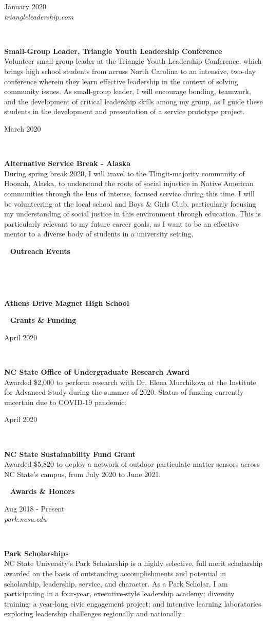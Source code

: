 \documentclass[8pt]{article}
\def \primarycolor   {spacecadet}
\def \tertiarycolor  {airforceblue} %
\def \titlerectmin{0.15cm}
\def \titlerectmax{0.35cm}
\def \leftcolwidth{3.05cm}
\newcommand{\cvheader}[1]{
    \tikz{\fill [\primarycolor] (0,\titlerectmin) rectangle (\leftcolwidth,\titlerectmax);} \ 
    \textcolor{\primarycolor}{ \large{\textbf{#1}} } 
}
\newcommand{\cventry}[4]{
    \begin{minipage}[t]{\leftcolwidth} 
        \small{
            \begin{flushright}
                #2\\
                \textcolor{\tertiarycolor}{\textit{#4}}
            \end{flushright}
        }
    \end{minipage} \ \
    \begin{minipage}[t]{\linewidth-\leftcolwidth} \normalsize{\textbf{#1} \\ #3} \end{minipage}
} %
\begin{document}
\cventry{Small-Group Leader, Triangle Youth Leadership Conference}{January 2020}{Volunteer small-group leader at the Triangle Youth Leadership Conference, which brings high school students from across North Carolina to an intensive, two-day conference wherein they learn effective leadership in the context of solving community issues. As small-group leader, I will encourage bonding, teamwork, and the development of critical leadership skills among my group, as I guide these students in the development and presentation of a service prototype project.
}
{triangleleadership.com}

\cventry{Alternative Service Break - Alaska}{March 2020}{During spring break 2020, I will travel to the Tlingit-majority community of Hoonah, Alaska, to understand the roots of social injustice in Native American communities through the lens of intense, focused service during this time. I will be volunteering at the local school and Boys \& Girls Club, particularly focusing my understanding of social justice in this environment through education. This is particularly relevant to my future career goals, as I want to be an effective mentor to a diverse body of students in a university setting.
}{}

\cvheader{Outreach Events}

\cventry{Athens Drive Magnet High School}{}{}{}

\cvheader{Grants \& Funding}

\cventry{NC State Office of Undergraduate Research Award}{April 2020}{Awarded \$2,000 to perform research with Dr. Elena Murchikova at the Institute for Advanced Study during the summer of 2020. Status of funding currently uncertain due to COVID-19 pandemic.}{}

\cventry{NC State Sustainability Fund Grant}{April 2020}{Awarded \$5,820 to deploy a network of outdoor particulate matter sensors across NC State's campus, from July 2020 to June 2021.}{}

\cvheader{Awards \& Honors}

\cventry{Park Scholarships}{Aug 2018 - Present}{NC State University's Park Scholarship is a highly selective, full merit scholarship awarded on the basis of outstanding accomplishments and potential in scholarship, leadership, service, and character. As a Park Scholar, I am participating in a four-year, executive-style leadership academy; diversity training; a year-long civic engagement project; and intensive learning laboratories exploring leadership challenges regionally and nationally.}{park.ncsu.edu}
\end{document}
